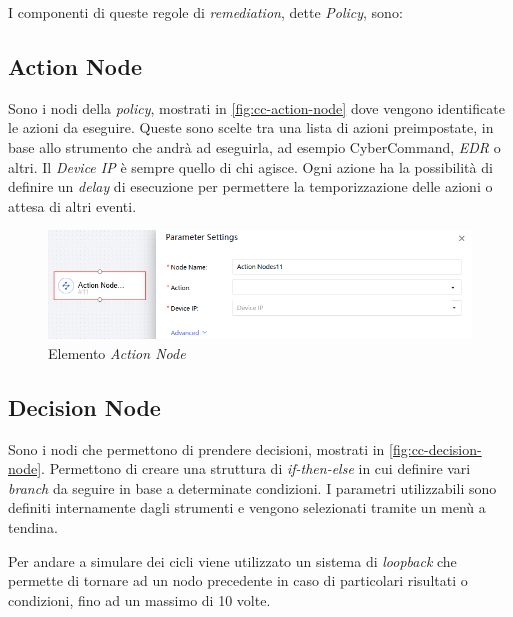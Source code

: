 I componenti di queste regole di \emph{remediation}, dette \emph{Policy}, sono:

\subsection{Action Node}

Sono i nodi della \emph{policy}, mostrati in \autoref{fig:cc-action-node} dove vengono identificate le azioni da eseguire. Queste sono scelte tra una lista di azioni preimpostate, in base allo strumento che andrà ad eseguirla, ad esempio CyberCommand, \emph{EDR} o altri. Il \emph{Device IP} è sempre quello di chi agisce. Ogni azione ha la possibilità di definire un \emph{delay} di esecuzione per permettere la temporizzazione delle azioni o attesa di altri eventi.

\begin{figure}[!htbp]
    \centering
    \includegraphics[width=\linewidth]{images/ndr/action-node.png}
    \caption{Elemento \emph{Action Node}}
    \label{fig:cc-action-node}
\end{figure}

\subsection{Decision Node}

Sono i nodi che permettono di prendere decisioni, mostrati in \autoref{fig:cc-decision-node}. Permettono di creare una struttura di \emph{if-then-else} in cui definire vari \emph{branch} da seguire in base a determinate condizioni. I parametri utilizzabili sono definiti internamente dagli strumenti e vengono selezionati tramite un menù a tendina.

Per andare a simulare dei cicli viene utilizzato un sistema di \emph{loopback} che permette di tornare ad un nodo precedente in caso di particolari risultati o condizioni, fino ad un massimo di 10 volte.

